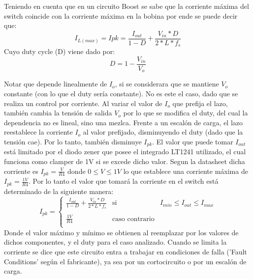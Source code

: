 \documentclass[e4_tp2_main.tex]{subfiles}
\begin{document}
Teniendo en cuenta que en un circuito Boost se sabe que la corriente máxima del switch coincide con la corriente máxima en la bobina por ende se puede decir que:
\begin{equation}
I_{L(max)}=I{pk}=\frac{I_{out}}{1-D}+\frac{V_{in}*D}{2*L*f_s}
\end{equation}
Cuyo duty cycle (D) viene dado por:
\begin{equation}
D=1-\frac{V_{in}}{V_{o}}
\end{equation} 


Notar que depende linealmente de $I_o$, si se considerara que se mantiene $V_o$ constante (con lo que el duty sería constante). No es este el caso, dado que se realiza un control por corriente. Al variar el valor de $I_o$ que prefija el lazo, también cambia la tensión de salida $V_o$ por lo que se modifica el duty, del cual la dependencia no es lineal, sino una mezlca. Frente a un escalón de carga, el lazo reestablece la corriente $I_o$ al valor prefijado, disminuyendo el duty (dado que la tensión cae). Por lo tanto, también disminuye $I_{pk}$.  
El valor que puede tomar $I_{out}$ está limitado por el diodo zener que posee el integrado LT1241 utilizado, el cual funciona como clamper de 1V si se excede dicho valor. Segun la datasheet dicha corriente es $I_{pk}=\frac{V}{R4} $ donde  $ 0 \leq V \leq 1V$ lo que establece una corriente máxima de $I_{pk}=\frac{1V}{R4}$. Por lo tanto el valor que tomará la corriente en el switch está determinado de la siguiente manera:
\[
I_{pk}= \left\{ \begin{array}{lcc}
             \frac{I_{out}}{1-D}+\frac{V_{in}*D}{2*L*f_s} &   \textrm{si}  & I_{min}\leq I_{out} \leq I_{max}  \\
             \\ \frac{1V}{R4} &  \textrm{caso contrario} \\
             \end{array}
   \right.
\]   
Donde el valor máximo y mínimo se obtienen al reemplazar por los valores de dichos componentes, y el duty para el caso analizado. Cuando se limita la corriente se dice que este circuito entra a trabajar en condiciones de falla ('Fault Conditions' según el fabricante), ya sea por un cortocircuito o por un escalón de carga.
\end{document}

